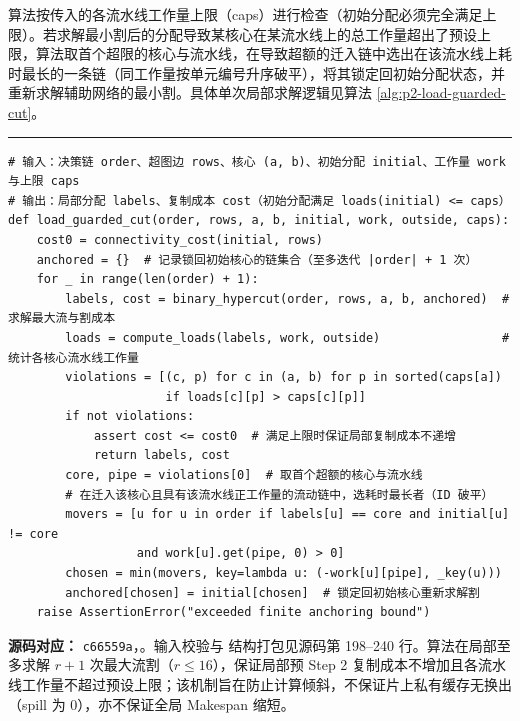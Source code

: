 \documentclass[anonymous,withtoc]{gmcm2026}
\begin{document}
算法按传入的各流水线工作量上限（caps）进行检查（初始分配必须完全满足上限）。若求解最小割后的分配导致某核心在某流水线上的总工作量超出了预设上限，算法取首个超限的核心与流水线，在导致超额的迁入链中选出在该流水线上耗时最长的一条链（同工作量按单元编号升序破平），将其锁定回初始分配状态，并重新求解辅助网络的最小割。具体单次局部求解逻辑见算法 \ref{alg:p2-load-guarded-cut}。

\FloatBarrier
\par{}\begingroup\normalsize
\captionsetup{type=algorithm,position=top,justification=raggedright,singlelinecheck=false,labelfont=bf}
\label{alg:p2-load-guarded-cut}
\nopagebreak\hrule\nopagebreak


\begin{lstlisting}[style=paperpseudo]
# 输入：决策链 order、超图边 rows、核心 (a, b)、初始分配 initial、工作量 work 与上限 caps
# 输出：局部分配 labels、复制成本 cost（初始分配满足 loads(initial) <= caps）
def load_guarded_cut(order, rows, a, b, initial, work, outside, caps):
    cost0 = connectivity_cost(initial, rows)
    anchored = {}  # 记录锁回初始核心的链集合（至多迭代 |order| + 1 次）
    for _ in range(len(order) + 1):
        labels, cost = binary_hypercut(order, rows, a, b, anchored)  # 求解最大流与割成本
        loads = compute_loads(labels, work, outside)                 # 统计各核心流水线工作量
        violations = [(c, p) for c in (a, b) for p in sorted(caps[a])
                      if loads[c][p] > caps[c][p]]
        if not violations:
            assert cost <= cost0  # 满足上限时保证局部复制成本不递增
            return labels, cost
        core, pipe = violations[0]  # 取首个超额的核心与流水线
        # 在迁入该核心且具有该流水线正工作量的流动链中，选耗时最长者（ID 破平）
        movers = [u for u in order if labels[u] == core and initial[u] != core
                  and work[u].get(pipe, 0) > 0]
        chosen = min(movers, key=lambda u: (-work[u][pipe], _key(u)))
        anchored[chosen] = initial[chosen]  # 锁定回初始核心重新求解割
    raise AssertionError("exceeded finite anchoring bound")
\end{lstlisting}
\textbf{源码对应：} \texttt{c66559a}，\texttt{}。输入校验与 \texttt{} 结构打包见源码第 198--240 行。算法在局部至多求解 \(r+1\) 次最大流割（\(r \le 16\)），保证局部预 Step 2 复制成本不增加且各流水线工作量不超过预设上限；该机制旨在防止计算倾斜，不保证片上私有缓存无换出（spill 为 0），亦不保证全局 Makespan 缩短。
\end{document}
